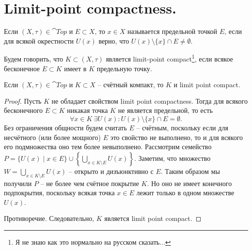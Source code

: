 \section{Limit-point compactness.}
\begin{definition}
    Если $(X, \tau) \in \cat{Top}$ и $E \subset X$, то $x \in X$ называется предельной точкой $E$, если для всякой окрестности $U(x)$ верно, что $U(x) \setminus \{x\} \cap E \neq \emptyset$.
\end{definition}
\begin{definition}
    Будем говорить, что $K \subset (X, \tau)$ является limit-point compact\footnote{Я не знаю как это нормально на русском сказать...}, если всякое бесконечное $E \subset K$ имеет в $K$ предельную точку.
\end{definition}
\begin{proposition}
    Если $(X, \tau) \in \cat{Top}$ и $K \subset X$ -- счётный компакт, то $K$ и limit point compact.
\end{proposition}
\begin{proof}
    Пусть $K$ не обладает свойством limit point compactness.
    Тогда для всякого бесконечного $E \subset K$ никакая точка $K$ не является предельной, то есть
    \[
        \forall x \in K \ \exists U(x)\colon U(x) \setminus \{x\} \cap E = \emptyset.
    \]
    Без ограничения общности будем считать $E$ -- счётным, поскольку если для несчётного (или более мощного) $E$ это свойство не выполнено, то и для всякого его подмножества оно тем более невыполнено.
    Рассмотрим семейство $P = \{U(x) \mid x \in E\} \cup \left\{ \bigcup_{x \in K \setminus E} U(x) \right\}$.
    Заметим, что множество $W = \bigcup_{x \in K \setminus E} U(x)$ -- открыто и дизъюнктивно с $E$.
    Таким образом мы получили $P$ -- не более чем счётное покрытие $K$.
    Но оно не имеет конечного подпокрытия, поскольку всякая точка $x \in E$ лежит только в одном множестве $U(x)$.

    Противоречие.
    Следовательно, $K$ является limit point compact.

\end{proof}
